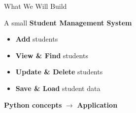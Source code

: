 \begin{frame}{What We Will Build}

    \begin{center}
        \Large A small \textbf{Student Management System}
    \end{center}

    \vspace{0.5cm}

    \begin{itemize}
        \item \textbf{Add} students
        \item \textbf{View \& Find} students
        \item \textbf{Update \& Delete} students
        \item \textbf{Save \& Load} student data
    \end{itemize}

    \vfill

    \begin{center}
        \textbf{Python concepts}
        \quad $\longrightarrow$ \quad
        \textbf{Application}
    \end{center}

\end{frame}